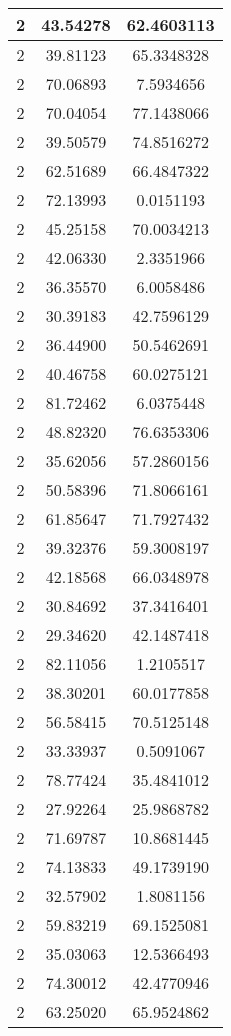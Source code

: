\documentclass[
]{book}
\begin{document}
\begin{tabular}{c|c|c}
\hline
2 & 43.54278 & 62.4603113\\
\hline
2 & 39.81123 & 65.3348328\\
\hline
2 & 70.06893 & 7.5934656\\
\hline
2 & 70.04054 & 77.1438066\\
\hline
2 & 39.50579 & 74.8516272\\
\hline
2 & 62.51689 & 66.4847322\\
\hline
2 & 72.13993 & 0.0151193\\
\hline
2 & 45.25158 & 70.0034213\\
\hline
2 & 42.06330 & 2.3351966\\
\hline
2 & 36.35570 & 6.0058486\\
\hline
2 & 30.39183 & 42.7596129\\
\hline
2 & 36.44900 & 50.5462691\\
\hline
2 & 40.46758 & 60.0275121\\
\hline
2 & 81.72462 & 6.0375448\\
\hline
2 & 48.82320 & 76.6353306\\
\hline
2 & 35.62056 & 57.2860156\\
\hline
2 & 50.58396 & 71.8066161\\
\hline
2 & 61.85647 & 71.7927432\\
\hline
2 & 39.32376 & 59.3008197\\
\hline
2 & 42.18568 & 66.0348978\\
\hline
2 & 30.84692 & 37.3416401\\
\hline
2 & 29.34620 & 42.1487418\\
\hline
2 & 82.11056 & 1.2105517\\
\hline
2 & 38.30201 & 60.0177858\\
\hline
2 & 56.58415 & 70.5125148\\
\hline
2 & 33.33937 & 0.5091067\\
\hline
2 & 78.77424 & 35.4841012\\
\hline
2 & 27.92264 & 25.9868782\\
\hline
2 & 71.69787 & 10.8681445\\
\hline
2 & 74.13833 & 49.1739190\\
\hline
2 & 32.57902 & 1.8081156\\
\hline
2 & 59.83219 & 69.1525081\\
\hline
2 & 35.03063 & 12.5366493\\
\hline
2 & 74.30012 & 42.4770946\\
\hline
2 & 63.25020 & 65.9524862\\

\end{tabular}
\end{document}
